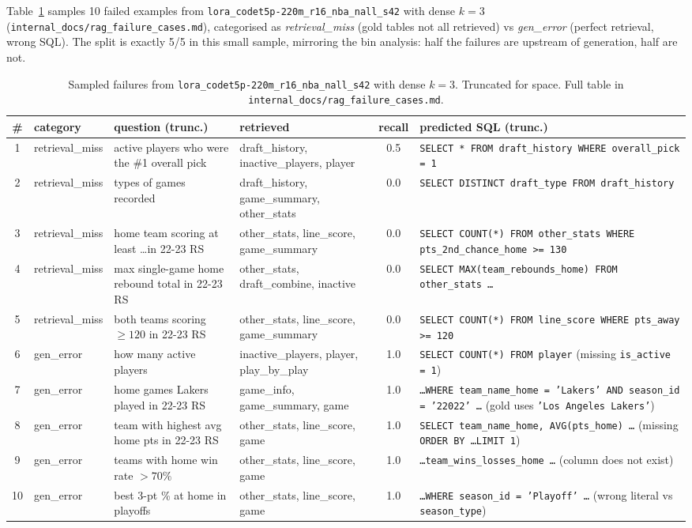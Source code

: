 \documentclass[11pt,a4paper]{article}
\newcommand{\bestckpt}{\texttt{lora\_codet5p-220m\_r16\_nba\_nall\_s42}}
\begin{document}
Table~\ref{tab:failures} samples 10 failed examples from \bestckpt{} with
dense $k=3$ (\texttt{internal\_docs/rag\_failure\_cases.md}), categorised as
\emph{retrieval\_miss} (gold tables not all retrieved) vs \emph{gen\_error}
(perfect retrieval, wrong SQL). The split is exactly 5/5 in this small sample,
mirroring the bin analysis: half the failures are upstream of generation,
half are not.

\begin{table}[h]
\centering
\caption{Sampled failures from \bestckpt{} with dense $k=3$. Truncated for
space. Full table in \texttt{internal\_docs/rag\_failure\_cases.md}.}
\label{tab:failures}
\scriptsize
\begin{tabular}{c l p{4.6cm} p{2.6cm} c p{3.5cm}}
\toprule
\# & category & question (trunc.) & retrieved & recall & predicted SQL (trunc.) \\
\midrule
1 & retrieval\_miss & active players who were the \#1 overall pick & draft\_history, inactive\_players, player & 0.5 & \texttt{SELECT * FROM draft\_history WHERE overall\_pick = 1} \\
2 & retrieval\_miss & types of games recorded & draft\_history, game\_summary, other\_stats & 0.0 & \texttt{SELECT DISTINCT draft\_type FROM draft\_history} \\
3 & retrieval\_miss & home team scoring at least \dots in 22-23 RS & other\_stats, line\_score, game\_summary & 0.0 & \texttt{SELECT COUNT(*) FROM other\_stats WHERE pts\_2nd\_chance\_home >= 130} \\
4 & retrieval\_miss & max single-game home rebound total in 22-23 RS & other\_stats, draft\_combine, inactive & 0.0 & \texttt{SELECT MAX(team\_rebounds\_home) FROM other\_stats \dots} \\
5 & retrieval\_miss & both teams scoring $\geq 120$ in 22-23 RS & other\_stats, line\_score, game\_summary & 0.0 & \texttt{SELECT COUNT(*) FROM line\_score WHERE pts\_away >= 120} \\
6 & gen\_error      & how many active players & inactive\_players, player, play\_by\_play & 1.0 & \texttt{SELECT COUNT(*) FROM player} (missing \texttt{is\_active = 1}) \\
7 & gen\_error      & home games Lakers played in 22-23 RS & game\_info, game\_summary, game & 1.0 & \texttt{\dots WHERE team\_name\_home = 'Lakers' AND season\_id = '22022' \dots} (gold uses \texttt{'Los Angeles Lakers'}) \\
8 & gen\_error      & team with highest avg home pts in 22-23 RS & other\_stats, line\_score, game & 1.0 & \texttt{SELECT team\_name\_home, AVG(pts\_home) \dots} (missing \texttt{ORDER BY \dots LIMIT 1}) \\
9 & gen\_error      & teams with home win rate $>70\%$ & other\_stats, line\_score, game & 1.0 & \texttt{\dots team\_wins\_losses\_home \dots} (column does not exist) \\
10 & gen\_error     & best 3-pt \% at home in playoffs & other\_stats, line\_score, game & 1.0 & \texttt{\dots WHERE season\_id = 'Playoff' \dots} (wrong literal vs \texttt{season\_type}) \\
\bottomrule
\end{tabular}
\end{table}
\end{document}
